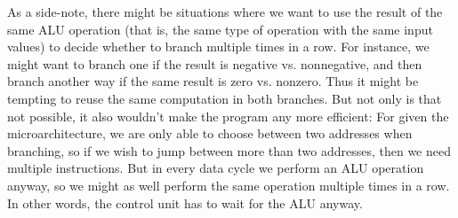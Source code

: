 \documentclass[article, a4paper, 11pt, oneside]{memoir}
\numberwithin{equation}{chapter}
\begin{document}
\begin{notelist}
As a side-note, there might be situations where we want to use the result of the same ALU operation (that is, the same type of operation with the same input values) to decide whether to branch multiple times in a row. For instance, we might want to branch one if the result is negative vs. nonnegative, and then branch another way if the same result is zero vs. nonzero. Thus it might be tempting to reuse the same computation in both branches. But not only is that not possible, it also wouldn't make the program any more efficient: For given the microarchitecture, we are only able to choose between two addresses when branching, so if we wish to jump between more than two addresses, then we need multiple instructions. But in every data cycle we perform an ALU operation anyway, so we might as well perform the same operation multiple times in a row. In other words, the control unit has to wait for the ALU anyway.

\end{notelist}
\end{document}
